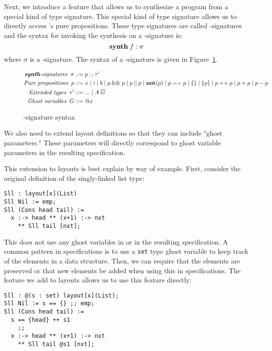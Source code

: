 \documentclass[acmsmall]{acmart}
\begin{document}
Next, we introduce a feature that allows us to synthesize a program from a special kind of \Pika{} type signature. This special kind of type signature allows us to directly access \SuSLik's pure propositions. These type signatures are called \synth-signatures and the syntax for invoking the \Pika{} synthesis on a \synth-signature is:
\[
  \textbf{synth}\; f : \sigma
\]
\noindent
where $\sigma$ is a \synth-signature. The syntax of a \synth-signature is given in Figure~\ref{fig:synth-sig-syntax}.

\begin{figure}
\[
\begin{aligned}
  \textit{\textbf{synth}-signatures}\;\; \sigma &::= p \mathbin{;;} \tau'\\
  \textit{Pure propositions}\;\; p &::= x \mid i \mid b \mid p \mathbin{\&\&} p \mid p \mathbin{||} p
    \mid \textbf{not}(p) \mid p == p \mid \{\} \mid \{p\} \mid p \mathbin{++} p \mid p + p \mid p - p\\
  \textit{Extended types}\;\; \tau' &::= ... \mid A\; \overline{G}\\
  \textit{Ghost variables}\;\; G &::= @x
\end{aligned}
\]
  \caption{\synth-signature syntax}
  \label{fig:synth-sig-syntax}
\end{figure}

\noindent
We also need to extend layout definitions so that they can include "ghost parameters." These parameters will directly correspond to ghost variable parameters in the resulting \SuSLik{} specification.

This extension to layouts is best explain by way of example. First, consider the original definition of the singly-linked list type:

\begin{lstlisting}
Sll : layout[x](List)
Sll Nil := emp;
Sll (Cons head tail) :=
  x :-> head ** (x+1) :-> nxt
    ** Sll tail [nxt];
\end{lstlisting}

\noindent
This does not use any ghost variables in \Pika{} or in the resulting \SuSLik{} specification. A common pattern in \SuSLik{} specifications is to use a \verb|set| type ghost variable to keep track of the elements in a data structure. Then, we can require that the elements are preserved or that new elements be added when using this in specifications. The feature we add to layouts allows us to use this feature directly:

\begin{lstlisting}
Sll : @(s : set) layout[x](List);
Sll Nil := s == {} ;; emp;
Sll (Cons head tail) :=
  s == {head} ++ s1
    ;;
  x :-> head ** (x+1) :-> nxt
    ** Sll tail @s1 [nxt];
\end{lstlisting}
\end{document}
